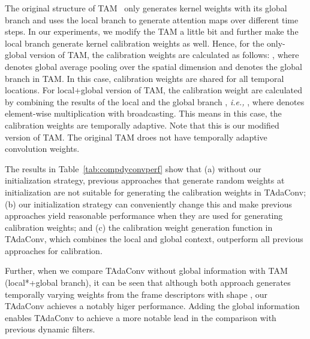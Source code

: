 \documentclass[10pt,journal,compsoc]{IEEEtran}
\begin{document}
The original structure of TAM~\cite{tam} only generates kernel weights with its global branch and uses the local branch to generate attention maps over different time steps. 
In our experiments, we modify the TAM a little bit and further make the local branch generate kernel calibration weights as well. 
Hence, for the only-global version of TAM, the calibration weights are calculated as follows: , where  denotes global average pooling over the spatial dimension and  denotes the global branch in TAM.
In this case, calibration weights are shared for all temporal locations.
For local+global version of TAM, the calibration weight are calculated by combining the results of the local  and the global branch , \textit{i.e.,} , where  denotes element-wise multiplication with broadcasting.
This means in this case, the calibration weights are temporally adaptive. Note that this is our modified version of TAM. The original TAM droes not have temporally adaptive convolution weights.

The results in Table~\ref{tab:compdyconvperf} show that (a) without our initialization strategy, previous approaches that generate random weights at initialization are not suitable for generating the calibration weights in TAdaConv; (b) our initialization strategy can conveniently change this and make previous approaches yield reasonable performance when they are used for generating calibration weights; and (c) the calibration weight generation function in TAdaConv, which combines the local and global context, outperform all previous approaches for calibration.

Further, when we compare TAdaConv without global information with TAM (local*+global branch), it can be seen that although both approach generates temporally varying weights from the frame descriptors  with shape , our TAdaConv achieves a notably higer performance. Adding the global information enables TAdaConv to achieve a more notable lead in the comparison with previous dynamic filters.
\end{document}

